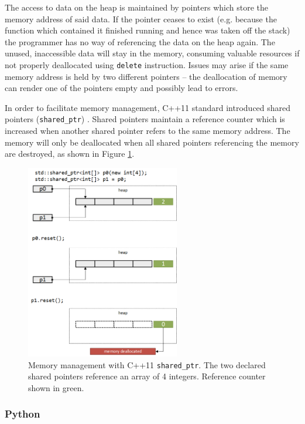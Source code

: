 The access to data on the heap is maintained by pointers which store the memory address of 
said data. If the pointer ceases to exist (e.g. because the function which contained it 
finished running and hence was taken off the stack) the programmer has no way of referencing 
the data on the heap again. The unused, inaccessible data will stay in the memory, consuming 
valuable resources if not properly deallocated using \texttt{delete} instruction. Issues may 
arise if the same memory address is held by two different pointers -- the deallocation of 
memory can render one of the pointers empty and possibly lead to errors.

In order to facilitate memory management, C++11 standard introduced shared pointers 
(\texttt{shared\_ptr}) \cite{C++SharedPtr}. Shared pointers maintain a reference counter 
which is increased when another shared pointer refers to the same memory address. The memory 
will only be deallocated when all shared pointers referencing the memory are destroyed, as shown 
in Figure \ref{fig:shared_ptr}.

\begin{figure}[h!]
    \centering
    \includegraphics[width=0.6\textwidth]{img/shared_ptr}
    \caption{Memory management with C++11 \texttt{shared\_ptr}. The two declared shared pointers 
    reference an array of 4 integers. Reference counter shown in green.}
    \label{fig:shared_ptr}
\end{figure}

\subsubsection{Python}

